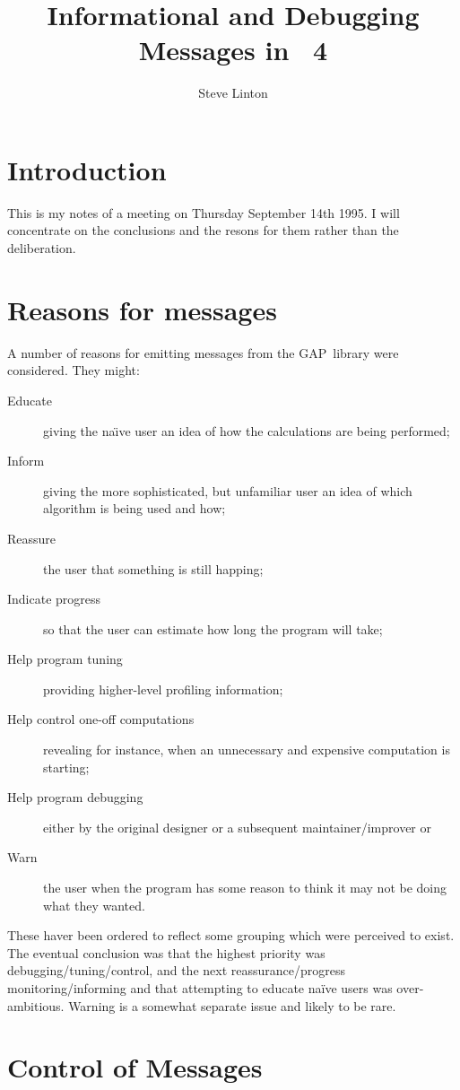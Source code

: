 \documentclass{article}
\title{Informational and Debugging Messages in \GAP\ 4}
\author{Steve Linton}
\def\GAP{\textsf{GAP}}
\begin{document}
\maketitle
\section{Introduction}

This is my notes of a meeting on Thursday September 14th 1995. I will
concentrate on the conclusions and the resons for them rather than the
deliberation.

\section{Reasons for messages}
A number of reasons for emitting messages from the \GAP\ library were
considered. They might:
\begin{description}
\item[Educate] giving the na\"\i ve user an idea of how the
calculations are being performed;
\item[Inform] giving the more sophisticated, but unfamiliar user an
idea of which algorithm is being used and how;
\item[Reassure] the user that something is still happing;
\item[Indicate progress] so that the user can estimate how long the
program will take;
\item[Help program tuning] providing higher-level profiling
information;
\item[Help control one-off computations] revealing for instance, when
an unnecessary and expensive computation is starting;
\item[Help program debugging] either by the original designer or a
subsequent maintainer/improver or
\item[Warn] the user when the program has some reason to think it may
not be doing what they wanted.
\end{description}

These haver been ordered to reflect some grouping which were perceived
to exist. The eventual conclusion was that the highest priority was
debugging/tuning/control, and the next reassurance/progress
monitoring/informing and that attempting to educate na\"ive users was
over-ambitious. Warning is a somewhat separate issue and likely to be rare.

\section{Control of Messages}
\end{document}
